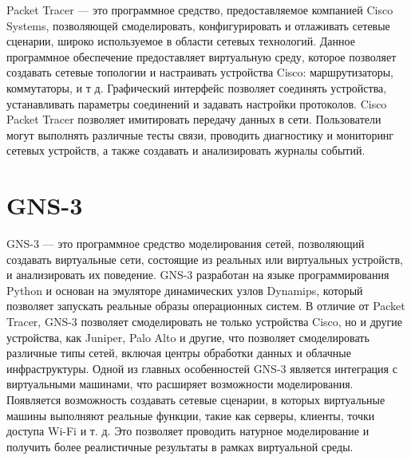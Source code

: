 Packet Tracer — это программное средство, предоставляемое компанией Cisco Systems, позволяющей смоделировать, конфигурировать и отлаживать сетевые сценарии, широко используемое в области сетевых технологий. Данное программное обеспечение предоставляет виртуальную среду, которое позволяет создавать сетевые топологии и настраивать устройства Cisco: маршрутизаторы, коммутаторы, и т д. Графический интерфейс позволяет соединять устройства, устанавливать параметры соединений и задавать настройки протоколов. Cisco Packet Tracer позволяет имитировать передачу данных в сети. Пользователи могут выполнять различные тесты связи, проводить диагностику и мониторинг сетевых устройств, а также создавать и анализировать журналы событий.

\section{GNS-3}

GNS-3 — это программное средство моделирования сетей, позволяющий создавать виртуальные сети, состоящие из реальных или виртуальных устройств, и анализировать их поведение. GNS-3 разработан на языке программирования Python и основан на эмуляторе динамических узлов Dynamips, который позволяет запускать реальные образы операционных систем. В отличие от Packet Tracer, GNS-3 позволяет смоделировать не только устройства Cisco, но и другие устройства, как Juniper, Palo Alto и другие, что позволяет смоделировать различные типы сетей, включая центры обработки данных и облачные инфраструктуры. Одной из главных особенностей GNS-3 является интеграция с виртуальными машинами, что расширяет возможности моделирования. Появляется возможность создавать сетевые сценарии, в которых виртуальные машины выполняют реальные функции, такие как серверы, клиенты, точки доступа Wi-Fi и т. д. Это позволяет проводить натурное моделирование и получить более реалистичные результаты в рамках виртуальной среды.





